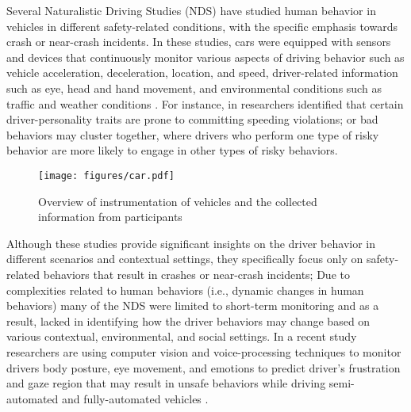 Several Naturalistic Driving Studies (NDS) have studied human behavior in vehicles in different safety-related conditions, with the specific emphasis towards crash or near-crash incidents. 
In these studies, cars were equipped with sensors and devices that continuously monitor various aspects of driving behavior such as vehicle acceleration, deceleration, location, and speed, driver-related information such as eye, head and hand movement, and environmental conditions such as traffic and weather conditions \cite{eenink2014udrive, simons2015naturalistic, fridman2017autonomous, klauer2006impact, victor2015analysis, papazikou2017detecting}. 
For instance, in \cite{eenink2014udrive} researchers identified that certain driver-personality traits are prone to committing speeding violations; 
or bad behaviors may cluster together, where drivers who perform one type of risky behavior are more likely to engage in other types of risky behaviors. \begin{figure}
    \centering
    \texttt{[image: figures/car.pdf]}
    \caption{Overview of instrumentation of vehicles and the collected information from participants}
    \label{fig:sensors}
\end{figure}
Although these studies provide significant insights on the driver behavior in different scenarios and contextual settings, they specifically focus only on safety-related behaviors that result in crashes or near-crash incidents; 
Due to complexities related to human behaviors (i.e., dynamic changes in human behaviors) many of the NDS were limited to short-term monitoring and as a result, lacked in identifying how the driver behaviors may change based on various contextual, environmental, and social settings. 
In a recent study researchers are using computer vision and voice-processing techniques to monitor drivers body posture, eye movement, and emotions to predict driver's frustration and gaze region that may result in unsafe behaviors while driving semi-automated and fully-automated vehicles \cite{fridman2017autonomous, abdic2016driver, fridman2016driver, fridman2018cognitive, fridman2016owl}. 
  
